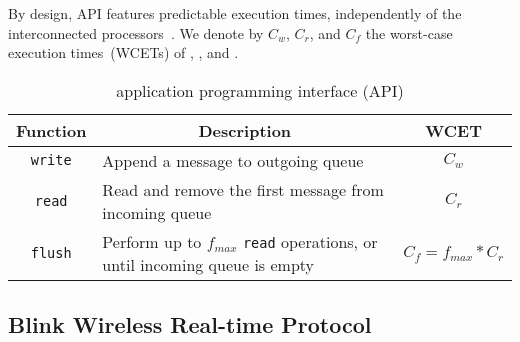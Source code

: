 By design, \bolt API features predictable execution times, independently of the interconnected processors~\cite{sutton2015Bolt}.
We denote by $C_w$, $C_r$, and $C_f$ the worst-case execution times~(WCETs) of \opwrite, \opread, and \opflush.

\begin{table}
\centering
\caption{\bolt application programming interface (API)}
  {\smaller
  \begin{tabularx}{\linewidth}{@{}c@{\qquad}X@{\qquad}c@{}}
    \toprule
      \textbf{Function} & \multicolumn{1}{c}{\textbf{Description}} & \textbf{WCET} \\
    \midrule
      \texttt{write}
    	& Append a message to outgoing queue
    	& $C_w$ \\[10pt]
      \texttt{read}
      & Read and remove the first message from incoming queue
      & $C_r$ \\[10pt]
      \texttt{flush}
      & Perform up to $f_{max}$ \texttt{read} operations, or until incoming queue is empty
      & $C_f = f_{max}*C_r$\\
    \bottomrule
  \end{tabularx}}
\label{table:boltAPI}
\end{table}

\subsection{Blink Wireless Real-time Protocol}
\label{subsec:details_blink}


